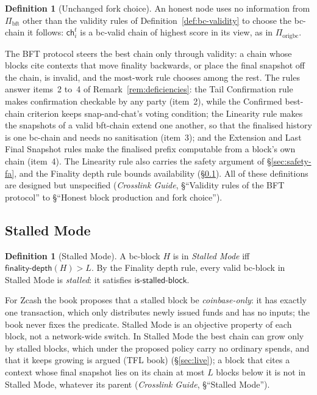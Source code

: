 \documentclass[11pt,a4paper]{article}
\theoremstyle{definition}
\newtheorem{definition}[theorem]{Definition}
\newcommand{\bft}{\mathrm{bft}}
\newcommand{\ch}{\mathsf{ch}}
\newcommand{\Piorigbc}{\Pi_{\mathrm{origbc}}}
\newcommand{\Pibft}{\Pi_{\bft}}
\newcommand{\isstalledblock}{\mathsf{is\text{-}stalled\text{-}block}}
\newcommand{\finalitydepth}{\mathsf{finality\text{-}depth}}
\begin{document}
\begin{definition}[Unchanged fork choice]\label{def:fork-choice}
An honest node uses no information from $\Pibft$ other than the validity
rules of Definition~\ref{def:bc-validity} to choose the bc-chain it follows:
$\ch_i^t$ is a bc-valid chain of highest score in its view, as in
$\Piorigbc$.
\end{definition}

The BFT protocol steers the best chain only through validity: a chain whose
blocks cite contexts that move finality backwards, or place the final
snapshot off the chain, is invalid, and the most-work rule chooses among the
rest. The rules answer items~2 to~4 of Remark~\ref{rem:deficiencies}: the
Tail Confirmation rule makes confirmation checkable by any party (item~2),
while the Confirmed best-chain criterion keeps snap-and-chat's voting
condition; the Linearity rule makes the snapshots of a valid
bft-chain extend one another, so that the finalised history is one bc-chain
and needs no sanitisation (item~3); and the Extension and Last Final
Snapshot rules make the finalised prefix computable from a block's own chain
(item~4). The Linearity rule also carries the safety argument of
\S\ref{sec:safety-fa}, and the Finality depth rule bounds availability
(\S\ref{sec:cons-stalled}). All of these
definitions are designed but unspecified (\emph{Crosslink Guide},
\S``Validity rules of the BFT protocol'' to \S``Honest block production and
fork choice'').

\subsection{Stalled Mode}\label{sec:cons-stalled}

\begin{definition}[Stalled Mode]\label{def:stalled}
A bc-block $H$ is in \emph{Stalled Mode} iff $\finalitydepth(H) > L$. By
the Finality depth rule, every valid bc-block in Stalled Mode is
\emph{stalled}: it satisfies $\isstalledblock$.
\end{definition}

For Zcash the book proposes that a stalled block be \emph{coinbase-only}: it
has exactly one transaction, which only distributes newly issued funds and
has no inputs; the book never fixes the predicate. Stalled Mode is an
objective property of each block, not a network-wide switch. In Stalled Mode
the best chain can grow only by stalled blocks, which under the proposed
policy carry no ordinary spends, and that it keeps growing is argued (TFL
book) (\S\ref{sec:live}); a block that cites a context whose
final snapshot lies on its chain at most $L$ blocks below it is not in
Stalled Mode, whatever its parent (\emph{Crosslink Guide}, \S``Stalled
Mode'').
\end{document}

